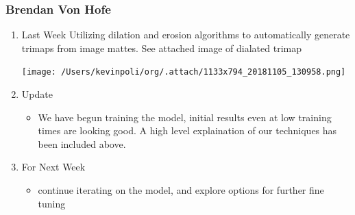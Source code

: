 \documentclass[15pt]{article}
\begin{document}
\subsubsection{Brendan Von Hofe}
\label{sec:org4a64ff4}
\begin{enumerate}
\item Last Week
\label{sec:org399d8a6}
Utilizing dilation and erosion algorithms to automatically generate trimaps from
image mattes. See attached image of dialated trimap

\begin{center}
\texttt{[image: /Users/kevinpoli/org/.attach/1133x794\_20181105\_130958.png]}
\end{center}
\item Update
\label{sec:orgcfc0503}
\begin{itemize}
\item We have begun training the model, initial results even at low training times
are looking good. A high level explaination of our techniques has been
included above.
\end{itemize}
\item For Next Week
\label{sec:org6508a78}
\begin{itemize}
\item continue iterating on the model, and explore options for further fine tuning
\end{itemize}
\end{enumerate}
\end{document}
